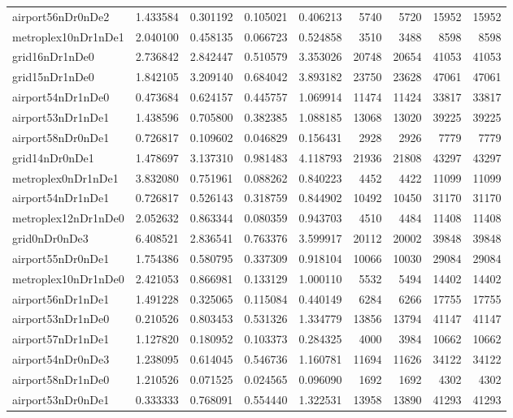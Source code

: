 \begin{longtable}{|l|r|r|r|r|r|r|r|r|}
airport56nDr0nDe2 & 1.433584 & 0.301192 & 0.105021 & 0.406213 & 5740 & 5720 & 15952 & 15952 \\
metroplex10nDr1nDe1 & 2.040100 & 0.458135 & 0.066723 & 0.524858 & 3510 & 3488 & 8598 & 8598 \\
grid16nDr1nDe0 & 2.736842 & 2.842447 & 0.510579 & 3.353026 & 20748 & 20654 & 41053 & 41053 \\
grid15nDr1nDe0 & 1.842105 & 3.209140 & 0.684042 & 3.893182 & 23750 & 23628 & 47061 & 47061 \\
airport54nDr1nDe0 & 0.473684 & 0.624157 & 0.445757 & 1.069914 & 11474 & 11424 & 33817 & 33817 \\
airport53nDr1nDe1 & 1.438596 & 0.705800 & 0.382385 & 1.088185 & 13068 & 13020 & 39225 & 39225 \\
airport58nDr0nDe1 & 0.726817 & 0.109602 & 0.046829 & 0.156431 & 2928 & 2926 & 7779 & 7779 \\
grid14nDr0nDe1 & 1.478697 & 3.137310 & 0.981483 & 4.118793 & 21936 & 21808 & 43297 & 43297 \\
metroplex0nDr1nDe1 & 3.832080 & 0.751961 & 0.088262 & 0.840223 & 4452 & 4422 & 11099 & 11099 \\
airport54nDr1nDe1 & 0.726817 & 0.526143 & 0.318759 & 0.844902 & 10492 & 10450 & 31170 & 31170 \\
metroplex12nDr1nDe0 & 2.052632 & 0.863344 & 0.080359 & 0.943703 & 4510 & 4484 & 11408 & 11408 \\
grid0nDr0nDe3 & 6.408521 & 2.836541 & 0.763376 & 3.599917 & 20112 & 20002 & 39848 & 39848 \\
airport55nDr0nDe1 & 1.754386 & 0.580795 & 0.337309 & 0.918104 & 10066 & 10030 & 29084 & 29084 \\
metroplex10nDr1nDe0 & 2.421053 & 0.866981 & 0.133129 & 1.000110 & 5532 & 5494 & 14402 & 14402 \\
airport56nDr1nDe1 & 1.491228 & 0.325065 & 0.115084 & 0.440149 & 6284 & 6266 & 17755 & 17755 \\
airport53nDr1nDe0 & 0.210526 & 0.803453 & 0.531326 & 1.334779 & 13856 & 13794 & 41147 & 41147 \\
airport57nDr1nDe1 & 1.127820 & 0.180952 & 0.103373 & 0.284325 & 4000 & 3984 & 10662 & 10662 \\
airport54nDr0nDe3 & 1.238095 & 0.614045 & 0.546736 & 1.160781 & 11694 & 11626 & 34122 & 34122 \\
airport58nDr1nDe0 & 1.210526 & 0.071525 & 0.024565 & 0.096090 & 1692 & 1692 & 4302 & 4302 \\
airport53nDr0nDe1 & 0.333333 & 0.768091 & 0.554440 & 1.322531 & 13958 & 13890 & 41293 & 41293 \\

\end{longtable}
